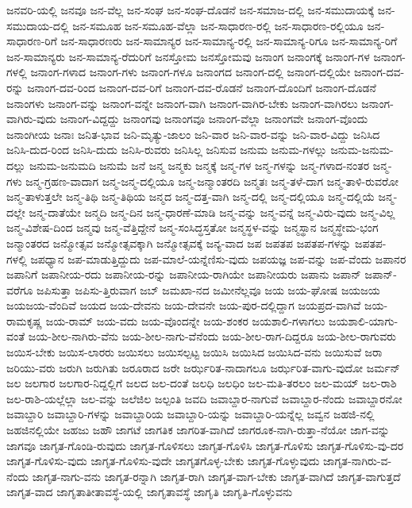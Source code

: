 {ಜನವರಿ-ಯಲ್ಲಿ
ಜನವೂ
ಜನ-ವೆಲ್ಲ
ಜನ-ಸಂಘ
ಜನ-ಸಂಘ-ದೊಡನೆ
ಜನ-ಸಮಾಜ-ದಲ್ಲಿ
ಜನ-ಸಮುದಾಯಕ್ಕೆ
ಜನ-ಸಮುದಾಯ-ದಲ್ಲಿ
ಜನ-ಸಮೂಹ
ಜನ-ಸಮೂಹ-ವೆಲ್ಲಾ
ಜನ-ಸಾಧಾರಣ-ರಲ್ಲಿ
ಜನ-ಸಾಧಾರಣ-ರಲ್ಲಿಯೂ
ಜನ-ಸಾಧಾರಣ-ರಿಗೆ
ಜನ-ಸಾಧಾರಣರು
ಜನ-ಸಾಮಾನ್ಯರ
ಜನ-ಸಾಮಾನ್ಯ-ರಲ್ಲಿ
ಜನ-ಸಾಮಾನ್ಯ-ರಿಗೂ
ಜನ-ಸಾಮಾನ್ಯ-ರಿಗೆ
ಜನ-ಸಾಮಾನ್ಯರು
ಜನ-ಸಾಮಾನ್ಯ-ರೆದುರಿಗೆ
ಜನಸ್ತೋಮ
ಜನಸ್ತೋಮವು
ಜನಾಂಗ
ಜನಾಂಗಕ್ಕೆ
ಜನಾಂಗ-ಗಳ
ಜನಾಂಗ-ಗಳಲ್ಲಿ
ಜನಾಂಗ-ಗಳಾದ
ಜನಾಂಗ-ಗಳು
ಜನಾಂಗ-ಗಳೂ
ಜನಾಂಗದ
ಜನಾಂಗ-ದಲ್ಲಿ
ಜನಾಂಗ-ದಲ್ಲಿಯೇ
ಜನಾಂಗ-ದವ-ರನ್ನು
ಜನಾಂಗ-ದವ-ರಿಂದ
ಜನಾಂಗ-ದವ-ರಿಗೆ
ಜನಾಂಗ-ದವ-ರೊಡನೆ
ಜನಾಂಗ-ದೊಂದಿಗೆ
ಜನಾಂಗ-ದೊಡನೆ
ಜನಾಂಗಳು
ಜನಾಂಗ-ವನ್ನು
ಜನಾಂಗ-ವನ್ನೇ
ಜನಾಂಗ-ವಾಗಿ
ಜನಾಂಗ-ವಾಗಿರ-ಬೇಕು
ಜನಾಂಗ-ವಾಗಿರಲು
ಜನಾಂಗ-ವಾಗಿರು-ವುದು
ಜನಾಂಗ-ವಿದ್ದದ್ದು
ಜನಾಂಗವು
ಜನಾಂಗವೂ
ಜನಾಂಗ-ವೆಲ್ಲಾ
ಜನಾಂಗವೇ
ಜನಾಂಗ-ವೊಂದು
ಜನಾಂಗೀಯ
ಜನಾಃ
ಜನಿತ-ಭಾವ
ಜನಿ-ಮೃತ್ಯು-ಜಾಲಂ
ಜನಿ-ವಾರ
ಜನಿ-ವಾರ-ವನ್ನು
ಜನಿ-ವಾರ-ವಿದ್ದು
ಜನಿಸಿದ
ಜನಿಸಿ-ದುದ-ರಿಂದ
ಜನಿಸಿ-ದುದು
ಜನಿಸಿ-ರುವರು
ಜನಿಸಿಲ್ಲ
ಜನಿಸುವ
ಜನುಮ
ಜನುಮ-ಗಳಲ್ಲು
ಜನುಮ-ಜನುಮ-ದಲ್ಲು
ಜನುಮ-ಜನುಮದಿ
ಜನುಮೆ
ಜನೆ
ಜನ್ಮ
ಜನ್ಮಕು
ಜನ್ಮಕ್ಕೆ
ಜನ್ಮ-ಗಳ
ಜನ್ಮ-ಗಳನ್ನು
ಜನ್ಮ-ಗಳಾದ-ನಂತರ
ಜನ್ಮ-ಗಳು
ಜನ್ಮ-ಗ್ರಹಣ-ವಾದಾಗ
ಜನ್ಮ-ಜನ್ಮ-ದಲ್ಲಿಯೂ
ಜನ್ಮ-ಜನ್ಮಾಂತರದಿ
ಜನ್ಮತಃ
ಜನ್ಮ-ತಳೆ-ದಾಗ
ಜನ್ಮ-ತಾಳಿ-ರುವರೋ
ಜನ್ಮ-ತಾಳುತ್ತಲೇ
ಜನ್ಮ-ತಿಥಿ
ಜನ್ಮ-ತಿಥಿಯ
ಜನ್ಮದ
ಜನ್ಮ-ದತ್ತ-ವಾಗಿ
ಜನ್ಮ-ದಲ್ಲಿ
ಜನ್ಮ-ದಲ್ಲಿಯೂ
ಜನ್ಮ-ದಲ್ಲಿಯೆ
ಜನ್ಮ-ದಲ್ಲೇ
ಜನ್ಮ-ದಾತೆಯೇ
ಜನ್ಮದಿ
ಜನ್ಮ-ದಿನ
ಜನ್ಮ-ಧಾರಣೆ-ಮಾಡಿ
ಜನ್ಮ-ವನ್ನು
ಜನ್ಮ-ವನ್ನೆ
ಜನ್ಮ-ವಿರು-ವುದು
ಜನ್ಮ-ವಿಲ್ಲ
ಜನ್ಮ-ವಿಶೇಷ-ದಿಂದ
ಜನ್ಮವು
ಜನ್ಮ-ವೆತ್ತಿದ್ದೇನೆ
ಜನ್ಮ-ಸಂಸಿದ್ಧಸ್ತತೋ
ಜನ್ಮಸ್ಥಳ-ವನ್ನು
ಜನ್ಮಸ್ಥಾನ
ಜನ್ಮಸ್ಥೇಮ-ಭಂಗ
ಜನ್ಮಾಂತರದ
ಜನ್ಮೋತ್ಸವ
ಜನ್ಮೋತ್ಸವಕ್ಕಾಗಿ
ಜನ್ಮೋತ್ಸವಕ್ಕೆ
ಜನ್ಯ-ವಾದ
ಜಪ
ಜಪತಪ
ಜಪತಪ-ಗಳನ್ನು
ಜಪತಪ-ಗಳಲ್ಲಿ
ಜಪಧ್ಯಾನ
ಜಪ-ಮಾಡುತ್ತಿದ್ದುದು
ಜಪ-ಮಾಲೆ-ಯನ್ನೆಣಿಸು-ವುದು
ಜಪಯಜ್ಞ
ಜಪ-ವನ್ನು
ಜಪ-ವೆಂದು
ಜಪಾನರ
ಜಪಾನಿಗೆ
ಜಪಾನೀಯ-ರದು
ಜಪಾನೀಯ-ರನ್ನು
ಜಪಾನೀಯ-ರಾಗಿಯೇ
ಜಪಾನೀಯರು
ಜಪಾನು
ಜಪಾನ್
ಜಪಾನ್-ವರೆಗೂ
ಜಪಿಸುತ್ತಾ
ಜಪಿಸು-ತ್ತಿರುವಾಗ
ಜಬ್
ಜಮಖಾ-ನದ
ಜಮೀನೆಲ್ಲವೂ
ಜಯ
ಜಯ-ಘೋಷ
ಜಯಜಯ
ಜಯಜಯ-ವೆಂದಿವೆ
ಜಯದ
ಜಯ-ದೇವನು
ಜಯ-ದೇವನೇ
ಜಯ-ಪುರ-ದಲ್ಲಿದ್ದಾಗ
ಜಯಪ್ರದ-ವಾಗಿವೆ
ಜಯ-ರಾಮಕೃಷ್ಣ
ಜಯ-ರಾಮ್
ಜಯ-ವದು
ಜಯ-ವೊಂದನ್ನೇ
ಜಯ-ಶಂಕರ
ಜಯಶಾಲಿ-ಗಳಾಗಲು
ಜಯಶಾಲಿ-ಯಾಗು-ವಂತೆ
ಜಯ-ಶೀಲ-ನಾಗಿರು-ವೆನು
ಜಯ-ಶೀಲ-ನಾಗು-ವೆನೆಂದು
ಜಯ-ಶೀಲ-ರಾಗ-ದಿದ್ದರೂ
ಜಯ-ಶೀಲ-ರಾಗುವರು
ಜಯಿಸ-ಬೇಕು
ಜಯಿಸ-ಲಾರರು
ಜಯಿಸಲು
ಜಯಿಸಲ್ಪಟ್ಟ
ಜಯಿಸಿ
ಜಯಿಸಿದ
ಜಯಿಸಿದ-ವನು
ಜಯಿಸುವೆ
ಜರಾ
ಜರಿಯು-ವರು
ಜರುಗಿ
ಜರುಗಿತು
ಜರೂರಾದ
ಜರೇ
ಜರ್ಝರಿತ-ನಾದಾಗಲೂ
ಜರ್ಝರಿತ-ವಾಗು-ವುದೋ
ಜರ್ಮನ್
ಜಲ
ಜಲಗಾರ
ಜಲಗಾರ-ನಿದ್ದಲ್ಲಿಗೆ
ಜಲದ
ಜಲ-ದಂತೆ
ಜಲಧಿ
ಜಲಧಿಂ
ಜಲ-ಮತಿ-ತರಲಂ
ಜಲ-ಮಯ್
ಜಲ-ರಾಶಿ
ಜಲ-ರಾಶಿ-ಯಲ್ಲೆಲ್ಲಾ
ಜಲ-ವನ್ನು
ಜಲೆಜಿಲ
ಜಲ್ಪಂತಿ
ಜವದಿ
ಜವಾಬ್ದಾರ-ನಾಗುವೆ
ಜವಾಬ್ದಾರ-ನೆಂದು
ಜವಾಬ್ದಾರನೋ
ಜವಾಬ್ದಾರಿ
ಜವಾಬ್ದಾರಿ-ಗಳನ್ನು
ಜವಾಬ್ದಾರಿಯ
ಜವಾಬ್ದಾರಿ-ಯನ್ನು
ಜವಾಬ್ದಾರಿ-ಯನ್ನೆಲ್ಲ
ಜವ್ವನ
ಜಹಜಿ-ನಲ್ಲಿ
ಜಹಜಿನಲ್ಲಿಯೇ
ಜಹಜು
ಜಹೌ
ಜಾಗಟೆ
ಜಾಗತಿಕ
ಜಾಗರಿತ-ವಾಗಿದೆ
ಜಾಗರೂಕ-ನಾಗಿ-ರುತ್ತಾ-ನೆಯೋ
ಜಾಗ-ವನ್ನು
ಜಾಗವೂ
ಜಾಗೃತ-ಗೊಂಡಿ-ರುವುದು
ಜಾಗೃತ-ಗೊಳಿಸಲು
ಜಾಗೃತ-ಗೊಳಿಸಿ
ಜಾಗೃತ-ಗೊಳಿಸು
ಜಾಗೃತ-ಗೊಳಿಸು-ವು-ದರ
ಜಾಗೃತ-ಗೊಳಿಸು-ವುದು
ಜಾಗೃತ-ಗೊಳಿಸು-ವುದೇ
ಜಾಗೃತಗೊಳ್ಳ-ಬೇಕು
ಜಾಗೃತ-ಗೊಳ್ಳುವುದು
ಜಾಗೃತ-ನಾಗಿರು-ವ-ನೆಂದು
ಜಾಗೃತ-ನಾಗು-ವನು
ಜಾಗೃತ-ರನ್ನಾಗಿ
ಜಾಗೃತ-ರಾಗಿ
ಜಾಗೃತ-ವಾಗ-ಬೇಕು
ಜಾಗೃತ-ವಾಗಿದೆ
ಜಾಗೃತ-ವಾಗುತ್ತದೆ
ಜಾಗೃತ-ವಾದ
ಜಾಗೃತಾತೀತಾವಸ್ಥೆ-ಯಲ್ಲಿ
ಜಾಗೃತಾವಸ್ಥೆ
ಜಾಗೃತಿ
ಜಾಗೃತಿ-ಗೊಳ್ಳುವನು
}
